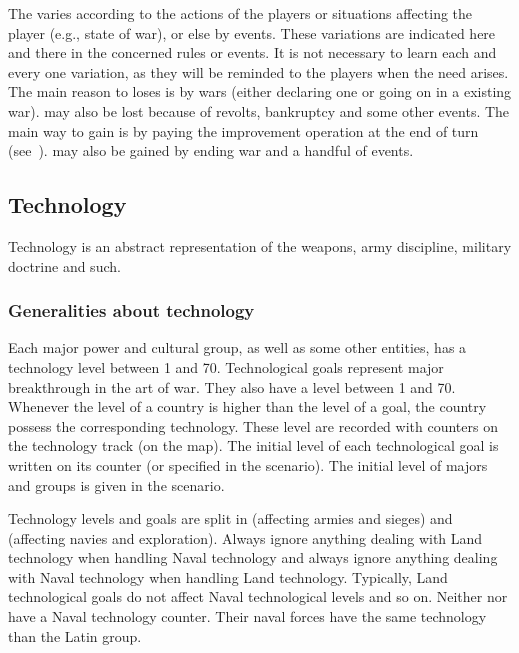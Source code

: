  The \STAB varies according to the actions
of the players or situations affecting the player (e.g., state of war), or
else by events.
\bparag These variations are indicated here and there in the concerned rules
or events. It is not necessary to learn each and every one variation, as they
will be reminded to the players when the need arises.
\bparag The main reason to loses \STAB is by wars (either declaring one or
going on in a existing war). \STAB may also be lost because of revolts,
bankruptcy and some other events.
\bparag The main way to gain \STAB is by paying the \STAB improvement
operation at the end of turn (see~). \STAB may also be gained by ending war and a handful of
events.

\subsection{Technology}\label{chThepowers:Technology}

\aparag Technology is an abstract representation of the weapons, army
discipline, military doctrine and such.


\subsubsection{Generalities about technology}
 Each major power and cultural group, as well as
some other entities, has a technology level between 1 and 70.
\bparag Technological goals represent major breakthrough in the art of
war. They also have a level between 1 and 70.
\bparag Whenever the level of a country is higher than the level of a goal,
the country possess the corresponding technology.
\bparag These level are recorded with counters on the technology track (on the
\ROTW map).
\bparag The initial level of each technological goal is written on its counter
(or specified in the scenario). The initial level of majors and groups is
given in the scenario.

 Technology levels and goals are split in  (affecting armies and sieges) and 
(affecting navies and exploration).
\bparag Always ignore anything dealing with Land technology when handling
Naval technology and always ignore anything dealing with Naval technology when
handling Land technology. Typically, Land technological goals do not affect
Naval technological levels and so on.
\bparag Neither \AUT nor \PRU have a Naval technology counter. Their naval
forces have the same technology than the Latin group.

